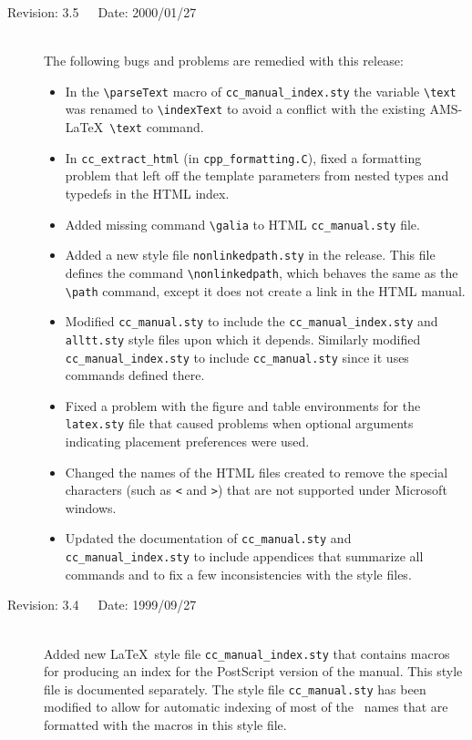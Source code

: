 \documentclass[11pt]{article}
\begin{document}
\begin{description}
    \item[Revision: 3.5~~~Date: 2000/01/27]~\\[3mm]
    The following bugs and problems are remedied with this release:
    \begin{itemize}
       \item In the \verb|\parseText| macro of \verb|cc_manual_index.sty| the
             variable \verb|\text| was renamed to \verb|\indexText| to avoid
             a conflict with the existing AMS-\LaTeX\ \verb|\text| command.
       \item In \verb|cc_extract_html| (in \verb|cpp_formatting.C|), fixed a 
             formatting problem that left off the template parameters from 
             nested types and typedefs in the HTML index.
       \item Added missing command \verb|\galia| to HTML \verb|cc_manual.sty| 
             file.
       \item Added a new style file {\tt nonlinkedpath.sty} in the release.
             This file defines the command \verb|\nonlinkedpath|, which
             behaves the same as the \verb|\path| command, except it 
             does not create a link in the HTML manual. 
       \item Modified {\tt cc\_manual.sty} to include the 
             {\tt cc\_manual\_index.sty} and {\tt alltt.sty} style files upon 
             which it depends.  Similarly modified {\tt cc\_manual\_index.sty} 
             to include {\tt cc\_manual.sty} since it uses commands defined 
             there.
       \item Fixed a problem with the figure and table environments for
             the {\tt latex.sty} file that caused problems when optional
             arguments indicating placement preferences were used.
       \item Changed the names of the HTML files created to remove the
             special characters (such as \verb|<| and \verb|>|) that are 
             not supported under Microsoft windows.
       \item Updated the documentation of {\tt cc\_manual.sty} and 
             {\tt cc\_manual\_index.sty} to include
             appendices that summarize all commands and to fix a few
             inconsistencies with the style files.
    \end{itemize}

    \item[Revision: 3.4~~~Date: 1999/09/27]~\\[3mm]
    Added new \LaTeX\ style file \verb|cc_manual_index.sty| that contains
    macros for producing an index for the PostScript version of the manual.  
    This style file is documented separately.
    The style file \verb|cc_manual.sty| has been modified to allow for
    automatic indexing of most of the \CC\ names that are formatted with the
    macros in this style file.


\end{description}
\end{document}
